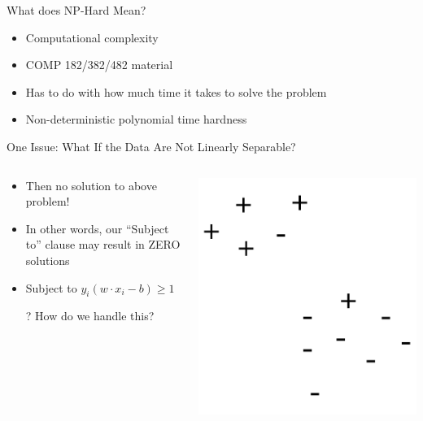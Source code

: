 \documentclass[aspectratio=169]{beamer}
\begin{document}
\begin{frame}{What does NP-Hard Mean?}

\begin{itemize}
\item Computational complexity 
\item COMP 182/382/482 material
\item Has to do with how much time it takes to solve the problem
\item Non-deterministic polynomial time hardness
\end{itemize}
\end{frame}
\begin{frame}{One Issue: What If the Data Are Not Linearly Separable?}

\begin{columns}
\begin{column}{0.6\textwidth}
\begin{itemize}
\item Then no solution to above problem!
\item In other words, our ``Subject to'' clause may result in ZERO solutions
\item Subject to $y_i (w \cdot x_i - b) \geq 1$
\item[?] How do we handle this?
\end{itemize}
\end{column}
\begin{column}{0.4\textwidth}
\includegraphics[width=1\textwidth]{lectSVM/nonLinSep.pdf}
\end{column}
\end{columns}

\end{frame}
\end{document}
